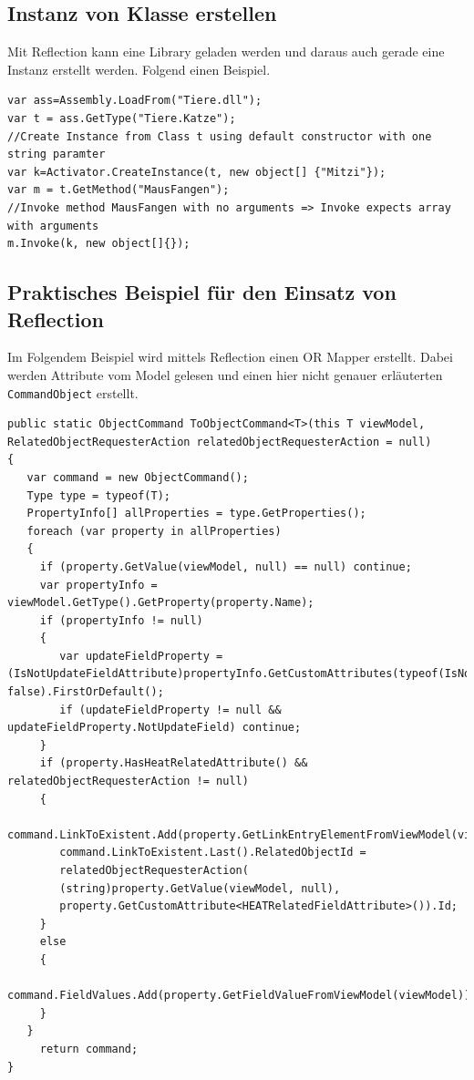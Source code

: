 \subsection{Instanz von Klasse erstellen}
Mit Reflection kann eine Library geladen werden und daraus auch gerade eine Instanz erstellt werden. Folgend einen Beispiel.
\begin{lstlisting}
var ass=Assembly.LoadFrom("Tiere.dll"); 
var t = ass.GetType("Tiere.Katze"); 
//Create Instance from Class t using default constructor with one string paramter
var k=Activator.CreateInstance(t, new object[] {"Mitzi"}); 
var m = t.GetMethod("MausFangen"); 
//Invoke method MausFangen with no arguments => Invoke expects array with arguments
m.Invoke(k, new object[]{});
\end{lstlisting}

\subsection{Praktisches Beispiel für den Einsatz von Reflection}
Im Folgendem Beispiel wird mittels Reflection einen OR Mapper erstellt. Dabei werden Attribute vom Model gelesen und einen hier nicht genauer erläuterten  \lstinline|CommandObject| erstellt.
\begin{lstlisting}
public static ObjectCommand ToObjectCommand<T>(this T viewModel, RelatedObjectRequesterAction relatedObjectRequesterAction = null)
{
   var command = new ObjectCommand(); 
   Type type = typeof(T);
   PropertyInfo[] allProperties = type.GetProperties();
   foreach (var property in allProperties)
   {
     if (property.GetValue(viewModel, null) == null) continue;
     var propertyInfo = viewModel.GetType().GetProperty(property.Name);
     if (propertyInfo != null)
     {
        var updateFieldProperty = (IsNotUpdateFieldAttribute)propertyInfo.GetCustomAttributes(typeof(IsNotUpdateFieldAttribute), false).FirstOrDefault();
        if (updateFieldProperty != null && updateFieldProperty.NotUpdateField) continue;
     }
     if (property.HasHeatRelatedAttribute() && relatedObjectRequesterAction != null)
     {
        command.LinkToExistent.Add(property.GetLinkEntryElementFromViewModel(viewModel));
        command.LinkToExistent.Last().RelatedObjectId =
        relatedObjectRequesterAction(
        (string)property.GetValue(viewModel, null),
        property.GetCustomAttribute<HEATRelatedFieldAttribute>()).Id;
     }
     else
     {               
        command.FieldValues.Add(property.GetFieldValueFromViewModel(viewModel));
     }
   }
     return command;
}
\end{lstlisting}

